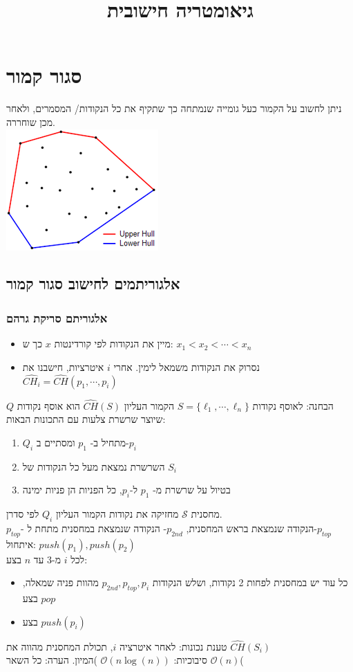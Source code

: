 \documentclass{article}
\title{ גיאומטריה חישובית }
\makeatletter
\newcommand*{\saved@uline}{}
\let\saved@uline\uline
\newcommand*{\mathuline}{%
  \mathpalette{\math@uline\saved@uline}%
}
\newcommand*{\math@uline}[3]{%
  \mbox{#1{$#2#3\m@th$}}%
}
\renewcommand*{\uline}{%
  \relax  
  \ifmmode
    \expandafter\mathuline
  \else
    \expandafter\saved@uline
  \fi
}
\makeatother
\begin{document}
\maketitle
\section{ סגור קמור}
ניתן לחשוב על הקמור כעל גומייה שנמתחה כך שתקיף את כל הנקודות/ המסמרים, ולאחר מכן שוחררה.\\
\includegraphics[scale=0.7]{z1.png}
\subsection{אלגוריתמים לחישוב סגור קמור}
\subsubsection{אלגוריתם סריקת גרהם}
\begin{itemize}
\item מיין את הנקודות לפי קורדינטות  $x$ כך ש: $x_1 < x_2 < \cdots < x_n$
\item נסרוק את הנקודות משמאל לימין. אחרי $i$ איטרציות, חישבנו את $\hat{CH_i}= \hat{CH}(p_1, \cdots, p_i)$
\end{itemize}
\uline{הבחנה:} לאוסף נקודות $S=\{\ell_1, \cdots, \ell_n \}$ הקמור העליון $\hat{CH}(S)$ הוא אוסף נקודות $Q$ שיוצר שרשרת צלעות עם התכונות הבאות:
\begin{enumerate}
\item $Q_i$ מתחיל ב- $p_1$ ומסתיים ב-$p_i$
\item השרשרת נמצאת מעל כל הנקודות של $S_i$
\item בטיול על שרשרת מ- $p_1$ ל-$p_i$, כל הפניות הן פניות ימינה
\end{enumerate}
מחסנית $\mathcal{S}$ מחזיקה את נקודות הקמור העליון $Q_i$ לפי סדרן.\\ $p_{top}$- הנקודה שנמצאת בראש המחסנית, $p_{2nd}$- הנקודה שנמצאת במחסנית מתחת ל-$p_{top}$\\
\uline{איתחול:} $push(p_1), push(p_2)$\\
\uline{לכל $i$ מ-3 עד $n$ בצע:}
\begin{itemize}
\item 
כל עוד יש במחסנית לפחות 2 נקודות, ושלש הנקודות $p_{2nd}, p_{top}, p_i$ מהוות פניה שמאלה, בצע $pop$
\item בצע $push(p_i)$
\end{itemize}
\uline{טענת נכונות:} לאחר איטרציה $i$, תכולת המחסנית מהווה את $\hat{CH}(S_i)$\\
\uline{סיבוכיות:} $\mathcal{O}(n \log(n))$ )המיון. הערה: כל השאר $\mathcal{O}(n)$(\\
\end{document}
